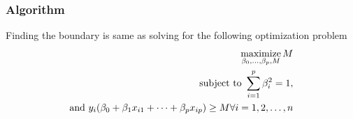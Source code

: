 \documentclass[11pt, a4paper]{article}
\begin{document}
    
    \subsubsection{Algorithm}
    Finding the boundary is same as solving for the following optimization problem
    \begin{align*}
        \operatorname*{maximize}_{\beta_{0},\ldots,\beta_{p}, M} M\\
        \text{subject to } \sum_{i=1}^{p} \beta_{i}^{2} = 1,\\
        \text{and } y_{i}(\beta_{0} + \beta_{1}x_{i1} + \cdots + \beta_{p}x_{ip}) \geq M \forall i = 1, 2, \ldots, n
    \end{align*}

    
\end{document}
